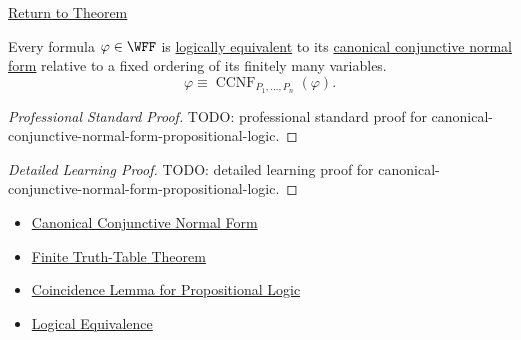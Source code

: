\newpage
{}
\label{prf:canonical-conjunctive-normal-form-propositional-logic}

\begin{remark*}[Return]
\hyperref[thm:canonical-conjunctive-normal-form-propositional-logic]{Return to Theorem}
\end{remark*}

\begin{theorem*}
Every formula \(\varphi\in\WFF\) is
\hyperref[def:logical-equivalence-propositional-logic]{logically equivalent}
to its
\hyperref[def:canonical-conjunctive-normal-form-propositional-logic]{canonical conjunctive normal form}
relative to a fixed ordering of its finitely many variables.
\[
\varphi\equiv \operatorname{CCNF}_{P_1,\ldots,P_n}(\varphi).
\]
\end{theorem*}

\begin{proof}[Professional Standard Proof]
\LRAProofBodyStart
TODO: professional standard proof for canonical-conjunctive-normal-form-propositional-logic.
\end{proof}

\begin{proof}[Detailed Learning Proof]
\LRAProofBodyStart
TODO: detailed learning proof for canonical-conjunctive-normal-form-propositional-logic.
\end{proof}

\begin{remark*}
\end{remark*}

\begin{dependencies}
\begin{itemize}
  \item \hyperref[def:canonical-conjunctive-normal-form-propositional-logic]{Canonical Conjunctive Normal Form}
  \item \hyperref[thm:finite-truth-table-propositional-logic]{Finite Truth-Table Theorem}
  \item \hyperref[lem:coincidence-lemma-propositional-logic]{Coincidence Lemma for Propositional Logic}
  \item \hyperref[def:logical-equivalence-propositional-logic]{Logical Equivalence}
\end{itemize}
\end{dependencies}

\clearpage
